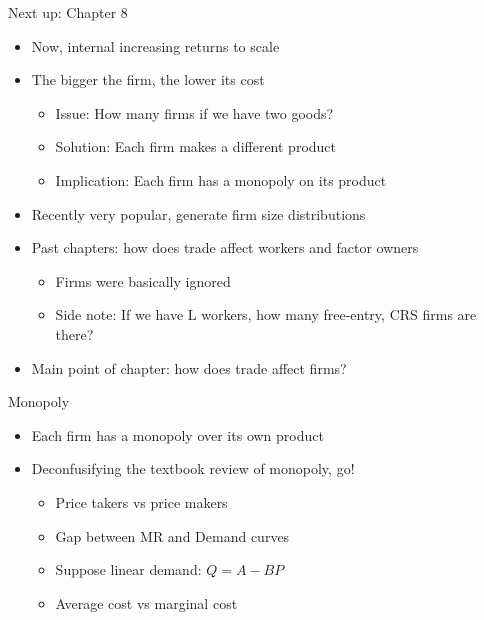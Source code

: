 \documentclass[ignorenonframetext,]{beamer}
\begin{document}
\begin{frame}{Next up: Chapter 8}

    \begin{itemize}
        \item Now, internal increasing returns to scale
        \item The bigger the firm, the lower its cost
        \begin{itemize}
            \item Issue: How many firms if we have two goods? 
            \item Solution: Each firm makes a different product
            \item Implication: Each firm has a monopoly on its product 
        \end{itemize}
        \item Recently very popular, generate firm size distributions
        \item Past chapters: how does trade affect workers and factor owners
        \begin{itemize}
            \item Firms were basically ignored
            \item Side note: If we have L workers, how many free-entry, CRS firms are there?
        \end{itemize}
        \item Main point of chapter: how does trade affect firms?
    \end{itemize}

\end{frame}

\begin{frame}{Monopoly}

    \begin{itemize}
        \item Each firm has a monopoly over its own product
        \item Deconfusifying the textbook review of monopoly, go!
        \begin{itemize}
            \item Price takers vs price makers
            \item Gap between MR and Demand curves
            \item Suppose linear demand: $Q = A - B P$
            \item Average cost vs marginal cost
        \end{itemize}
    \end{itemize}

\end{frame}
\end{document}
